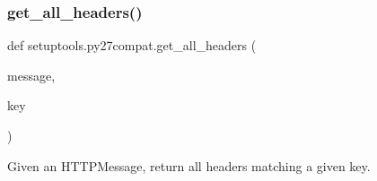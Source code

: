 \subsubsection{\texorpdfstring{get\+\_\+all\+\_\+headers()}{get\_all\_headers()}}
{\footnotesize\ttfamily def setuptools.\+py27compat.\+get\+\_\+all\+\_\+headers (\begin{DoxyParamCaption}\item[{}]{message,  }\item[{}]{key }\end{DoxyParamCaption})}

\begin{DoxyVerb}Given an HTTPMessage, return all headers matching a given key.
\end{DoxyVerb}
 